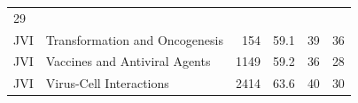\documentclass[11pt,]{article}
\begin{document}
\begin{longtable}[]{@{}llrrrr@{}}
\begin{minipage}[t]{0.11\columnwidth}
29\strut
\end{minipage}\tabularnewline
\begin{minipage}[t]{0.06\columnwidth}\raggedright\strut
JVI\strut
\end{minipage} & \begin{minipage}[t]{0.43\columnwidth}\raggedright\strut
Transformation and Oncogenesis\strut
\end{minipage} & \begin{minipage}[t]{0.04\columnwidth}\raggedleft\strut
154\strut
\end{minipage} & \begin{minipage}[t]{0.08\columnwidth}\raggedleft\strut
59.1\strut
\end{minipage} & \begin{minipage}[t]{0.11\columnwidth}\raggedleft\strut
39\strut
\end{minipage} & \begin{minipage}[t]{0.11\columnwidth}\raggedleft\strut
36\strut
\end{minipage}\tabularnewline
\begin{minipage}[t]{0.06\columnwidth}\raggedright\strut
JVI\strut
\end{minipage} & \begin{minipage}[t]{0.43\columnwidth}\raggedright\strut
Vaccines and Antiviral Agents\strut
\end{minipage} & \begin{minipage}[t]{0.04\columnwidth}\raggedleft\strut
1149\strut
\end{minipage} & \begin{minipage}[t]{0.08\columnwidth}\raggedleft\strut
59.2\strut
\end{minipage} & \begin{minipage}[t]{0.11\columnwidth}\raggedleft\strut
36\strut
\end{minipage} & \begin{minipage}[t]{0.11\columnwidth}\raggedleft\strut
28\strut
\end{minipage}\tabularnewline
\begin{minipage}[t]{0.06\columnwidth}\raggedright\strut
JVI\strut
\end{minipage} & \begin{minipage}[t]{0.43\columnwidth}\raggedright\strut
Virus-Cell Interactions\strut
\end{minipage} & \begin{minipage}[t]{0.04\columnwidth}\raggedleft\strut
2414\strut
\end{minipage} & \begin{minipage}[t]{0.08\columnwidth}\raggedleft\strut
63.6\strut
\end{minipage} & \begin{minipage}[t]{0.11\columnwidth}\raggedleft\strut
40\strut
\end{minipage} & \begin{minipage}[t]{0.11\columnwidth}\raggedleft\strut
30\strut
\end{minipage}\tabularnewline
\bottomrule
\end{longtable}
\end{document}
